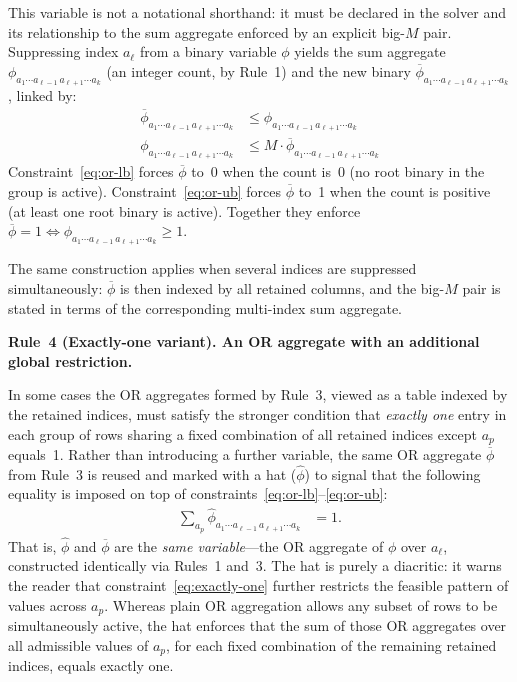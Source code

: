 \begin{convention}
This variable is not a notational shorthand: it must be declared in
the solver and its relationship to the sum aggregate enforced by an
explicit big-$M$ pair.
Suppressing index $a_\ell$ from a binary variable $\phi$ yields the
sum aggregate
$\phi_{a_1 \cdots a_{\ell-1}\, a_{\ell+1} \cdots a_k}$
(an integer count, by Rule~1) and the new binary
$\overline{\phi}_{a_1 \cdots a_{\ell-1}\, a_{\ell+1} \cdots a_k}$,
linked by:
%
\begin{align}
  \overline{\phi}_{a_1 \cdots a_{\ell-1}\, a_{\ell+1} \cdots a_k}
    &\leq
    \phi_{a_1 \cdots a_{\ell-1}\, a_{\ell+1} \cdots a_k}
  \label{eq:or-lb} \\
  \phi_{a_1 \cdots a_{\ell-1}\, a_{\ell+1} \cdots a_k}
    &\leq
    M \cdot \overline{\phi}_{a_1 \cdots a_{\ell-1}\, a_{\ell+1} \cdots a_k}
  \label{eq:or-ub}
\end{align}
%
Constraint~\eqref{eq:or-lb} forces $\overline{\phi}$ to~0 when the
count is~0 (no root binary in the group is active).
Constraint~\eqref{eq:or-ub} forces $\overline{\phi}$ to~1 when the
count is positive (at least one root binary is active).
Together they enforce
$\overline{\phi} = 1 \iff \phi_{a_1 \cdots a_{\ell-1}\, a_{\ell+1} \cdots a_k} \geq 1$.

The same construction applies when several indices are suppressed
simultaneously: $\overline{\phi}$ is then indexed by all retained
columns, and the big-$M$ pair is stated in terms of the corresponding
multi-index sum aggregate.

\medskip
\noindent\textbf{Rule~4 (Exactly-one variant).
  An OR aggregate with an additional global restriction.}

In some cases the OR aggregates formed by Rule~3, viewed as a table
indexed by the retained indices, must satisfy the stronger condition
that \emph{exactly one} entry in each group of rows sharing a fixed
combination of all retained indices except $a_p$ equals~1.
Rather than introducing a further variable, the same OR aggregate
$\overline{\phi}$ from Rule~3 is reused and marked with a hat
($\hat{\phi}$) to signal that the following equality is imposed on
top of constraints~\eqref{eq:or-lb}--\eqref{eq:or-ub}:
%
\begin{align}
  \sum_{a_p} \hat{\phi}_{a_1 \cdots a_{\ell-1}\, a_{\ell+1} \cdots a_k}
    &= 1.
  \label{eq:exactly-one}
\end{align}
%
That is, $\hat{\phi}$ and $\overline{\phi}$ are the \emph{same
variable}---the OR aggregate of $\phi$ over $a_\ell$, constructed
identically via Rules~1 and~3.
The hat is purely a diacritic: it warns the reader that
constraint~\eqref{eq:exactly-one} further restricts the feasible
pattern of values across $a_p$.
Whereas plain OR aggregation allows any subset of rows to be
simultaneously active, the hat enforces that the sum of those OR
aggregates over all admissible values of $a_p$, for each fixed
combination of the remaining retained indices, equals exactly one.


\end{convention}
